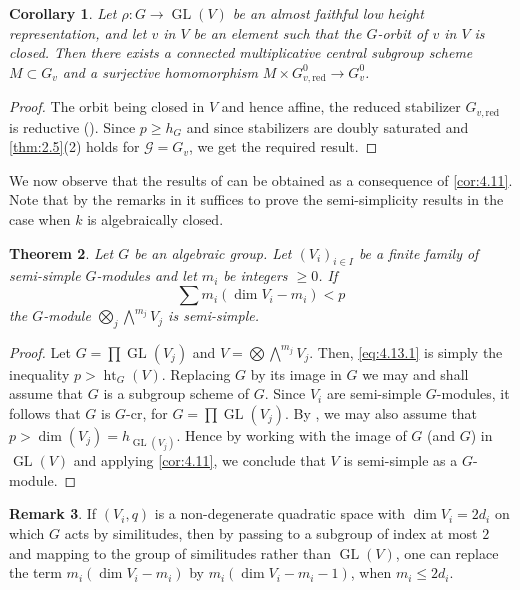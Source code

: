 \documentclass[11pt,a4paper]{article}
\theoremstyle{plain}
\newtheorem{theorem}{Theorem}[section]
\newtheorem{corollary}[theorem]{Corollary}
\theoremstyle{definition}
\newtheorem{remark}[theorem]{Remark}
\DeclareMathOperator{\GL}{GL}
\DeclareMathOperator{\htG}{ht}
\newcommand{\red}{\mathrm{red}}
\begin{document}
\begin{corollary} \label{cor:4.12}
Let $\rho : G \to \GL(V)$ be an almost faithful low height representation, and let $v$ in $V$ be an element such that the $G$-orbit of $v$ in $V$ is closed. Then there exists a connected multiplicative central subgroup scheme $M \subset G_v$ and a surjective homomorphism $M \times G_{v,\red}^0 \to G_v^0$.
\end{corollary}

\begin{proof}
The orbit being closed in $V$ and hence affine, the reduced stabilizer $G_{v,\red}$ is reductive (\cite{Bo}). Since $p \geq h_G$ and since stabilizers are doubly saturated and \ref{thm:2.5}(2) holds for $\mathcal{G} = G_v$, we get the required result. \qedhere
\end{proof}

We now observe that the results of \cite[Section~6]{D} can be obtained as a consequence of \ref{cor:4.11}. Note that by the remarks in \cite[page~607]{D} it suffices to prove the semi-simplicity results in the case when $k$ is algebraically closed.

\begin{theorem} \label{thm:4.13}
Let $G$ be an algebraic group. Let $(V_i)_{i \in I}$ be a finite family of semi-simple $G$-modules and let $m_i$ be integers $\geq 0$. If
\begin{equation} \label{eq:4.13.1}
\sum m_i (\dim V_i - m_i) < p
\end{equation}
the $G$-module $\bigotimes_j \bigwedge^{m_j} V_j$ is semi-simple.
\end{theorem}

\begin{proof}
Let $G = \prod \GL(V_j)$ and $V = \bigotimes \bigwedge^{m_j} V_j$. Then, \eqref{eq:4.13.1} is simply the inequality $p > \htG_G(V)$. Replacing $G$ by its image in $G$ we may and shall assume that $G$ is a subgroup scheme of $G$. Since $V_i$ are semi-simple $G$-modules, it follows that $G$ is $G$-cr, for $G = \prod \GL(V_j)$. By \cite[\S6.2]{D}, we may also assume that $p > \dim(V_j) = h_{\GL(V_j)}$. Hence by working with the image of $G$ (and $G$) in $\GL(V)$ and applying \ref{cor:4.11}, we conclude that $V$ is semi-simple as a $G$-module. \qedhere
\end{proof}

\begin{remark} \label{rem:4.14}
If $(V_i, q)$ is a non-degenerate quadratic space with $\dim V_i = 2d_i$ on which $G$ acts by similitudes, then by passing to a subgroup of index at most $2$ and mapping to the group of similitudes rather than $\GL(V)$, one can replace the term $m_i(\dim V_i - m_i)$ by $m_i(\dim V_i - m_i - 1)$, when $m_i \leq 2d_i$.
\end{remark}
\end{document}
